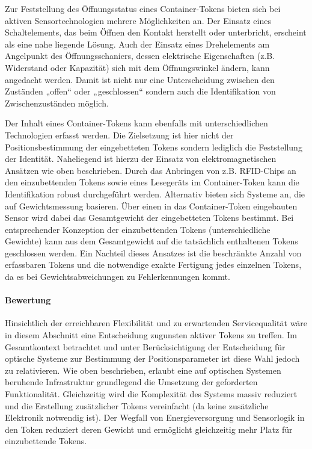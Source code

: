 Zur Feststellung des Öffnungsstatus eines Container-Tokens bieten sich bei aktiven Sensortechnologien mehrere Möglichkeiten an. Der Einsatz eines Schaltelements, das beim Öffnen den Kontakt herstellt oder unterbricht, erscheint als eine nahe liegende Lösung. Auch der Einsatz eines Drehelements am Angelpunkt des Öffnungsschaniers, dessen elektrische Eigenschaften (z.B. Widerstand oder Kapazität) sich mit dem Öffnungswinkel ändern, kann angedacht werden. Damit ist nicht nur eine Unterscheidung zwischen den Zuständen „offen“ oder „geschlossen“ sondern auch die Identifikation von Zwischenzuständen möglich.

Der Inhalt eines Container-Tokens kann ebenfalls mit unterschiedlichen Technologien erfasst werden. Die Zielsetzung ist hier nicht der Positionsbestimmung der eingebetteten Tokens sondern lediglich die Feststellung der Identität. Naheliegend ist hierzu der Einsatz von elektromagnetischen Ansätzen wie oben beschrieben. Durch das Anbringen von z.B. \gls{RFID}-Chips an den einzubettenden Tokens sowie eines Lesegeräts im Container-Token kann die Identifikation robust durchgeführt werden. Alternativ bieten sich Systeme an, die auf Gewichtsmessung basieren. Über einen in das Container-Token eingebauten Sensor wird dabei das Gesamtgewicht der eingebetteten Tokens bestimmt. Bei entsprechender Konzeption der einzubettenden Tokens (unterschiedliche Gewichte) kann aus dem Gesamtgewicht auf die tatsächlich enthaltenen Tokens geschlossen werden. Ein Nachteil dieses Ansatzes ist die beschränkte Anzahl von erfassbaren Tokens und die notwendige exakte Fertigung jedes einzelnen Tokens, da es bei Gewichtsabweichungen zu Fehlerkennungen kommt.


\paragraph{Bewertung} %
\label{par:zustand_bewertung}

Hinsichtlich der erreichbaren Flexibilität und zu erwartenden Servicequalität wäre in diesem Abschnitt eine Entscheidung zugunsten aktiver Tokens zu treffen. Im Gesamtkontext betrachtet und unter Berücksichtigung der Entscheidung für optische Systeme zur Bestimmung der Positionsparameter ist diese Wahl jedoch zu relativieren. Wie oben beschrieben, erlaubt eine auf optischen Systemen beruhende Infrastruktur grundlegend die Umsetzung der geforderten Funktionalität. Gleichzeitig wird die Komplexität des Systems massiv reduziert und die Erstellung zusätzlicher Tokens vereinfacht (da keine zusätzliche Elektronik notwendig ist). Der Wegfall von Energieversorgung und Sensorlogik in den Token reduziert deren Gewicht und ermöglicht gleichzeitig mehr Platz für einzubettende Tokens.

